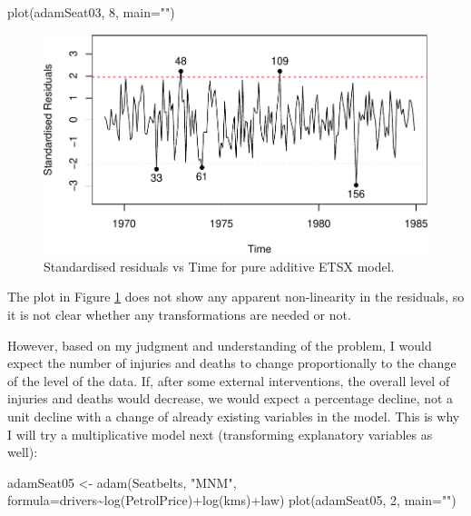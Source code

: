 \documentclass[
]{book}
\newenvironment{Shaded}{\begin{snugshade}}{\end{snugshade}}
\newcommand{\AttributeTok}[1]{\textcolor[rgb]{0.77,0.63,0.00}{#1}}
\newcommand{\DecValTok}[1]{\textcolor[rgb]{0.00,0.00,0.81}{#1}}
\newcommand{\FunctionTok}[1]{\textcolor[rgb]{0.00,0.00,0.00}{#1}}
\newcommand{\NormalTok}[1]{#1}
\newcommand{\OtherTok}[1]{\textcolor[rgb]{0.56,0.35,0.01}{#1}}
\newcommand{\SpecialCharTok}[1]{\textcolor[rgb]{0.00,0.00,0.00}{#1}}
\newcommand{\StringTok}[1]{\textcolor[rgb]{0.31,0.60,0.02}{#1}}
\theoremstyle{definition}
\theoremstyle{definition}
\theoremstyle{definition}
\theoremstyle{definition}
\theoremstyle{remark}
\begin{document}
\begin{Shaded}
\begin{Highlighting}[]
\FunctionTok{plot}\NormalTok{(adamSeat03, }\DecValTok{8}\NormalTok{, }\AttributeTok{main=}\StringTok{""}\NormalTok{)}
\end{Highlighting}
\end{Shaded}

\begin{figure}
\centering
\includegraphics{Svetunkov--2022----ADAM_files/figure-latex/adamSeat03ResidTime-1.pdf}
\caption{\label{fig:adamSeat03ResidTime}Standardised residuals vs Time for pure additive ETSX model.}
\end{figure}

The plot in Figure \ref{fig:adamSeat03ResidTime} does not show any apparent non-linearity in the residuals, so it is not clear whether any transformations are needed or not.

However, based on my judgment and understanding of the problem, I would expect the number of injuries and deaths to change proportionally to the change of the level of the data. If, after some external interventions, the overall level of injuries and deaths would decrease, we would expect a percentage decline, not a unit decline with a change of already existing variables in the model. This is why I will try a multiplicative model next (transforming explanatory variables as well):

\begin{Shaded}
\begin{Highlighting}[]
\NormalTok{adamSeat05 }\OtherTok{\textless{}{-}} \FunctionTok{adam}\NormalTok{(Seatbelts, }\StringTok{"MNM"}\NormalTok{,}
                   \AttributeTok{formula=}\NormalTok{drivers}\SpecialCharTok{\textasciitilde{}}\FunctionTok{log}\NormalTok{(PetrolPrice)}\SpecialCharTok{+}\FunctionTok{log}\NormalTok{(kms)}\SpecialCharTok{+}\NormalTok{law)}
\FunctionTok{plot}\NormalTok{(adamSeat05, }\DecValTok{2}\NormalTok{, }\AttributeTok{main=}\StringTok{""}\NormalTok{)}
\end{Highlighting}
\end{Shaded}
\end{document}
